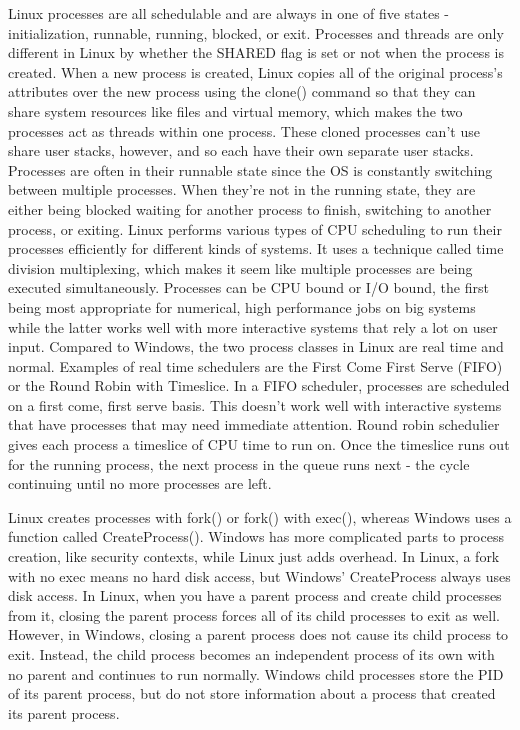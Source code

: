 \documentclass[10pt,draftclsnofoot,onecolumn,letterpaper]{IEEEtran}
\begin{document}
Linux processes are all schedulable and are always in one of five states - initialization, runnable, running, blocked, or exit. Processes and threads are only different in Linux by whether the SHARED flag is set or not when the process is created\cite{1}. When a new process is created, Linux copies all of the original process's attributes over the new process using the clone() command so that they can share system resources like files and virtual memory, which makes the two processes act as threads within one process. These cloned processes can't use share user stacks, however, and so each have their own separate user stacks\cite{2}.
Processes are often in their runnable state since the OS is constantly switching between multiple processes. When they're not in the running state, they are either being blocked waiting for another process to finish, switching to another process, or exiting\cite{1}.
Linux performs various types of CPU scheduling to run their processes efficiently for different kinds of systems. It uses a technique called time division multiplexing, which makes it seem like multiple processes are being executed simultaneously. Processes can be CPU bound or I/O bound, the first being most appropriate for numerical, high performance jobs on big systems while the latter works well with more interactive systems that rely a lot on user input\cite{1}. Compared to Windows, the two process classes in Linux are real time and normal. Examples of real time schedulers are the First Come First Serve (FIFO) or the Round Robin with Timeslice. In a FIFO scheduler, processes are scheduled on a first come, first serve basis. This doesn't work well with interactive systems that have processes that may need immediate attention. Round robin schedulier gives each process a timeslice of CPU time to run on. Once the timeslice runs out for the running process, the next process in the queue runs next - the cycle continuing until no more processes are left\cite{1}.

Linux creates processes with fork() or fork() with exec(), whereas Windows uses a function called CreateProcess(). Windows has more complicated parts to process creation, like security contexts, while Linux just adds overhead. In Linux, a fork with no exec means no hard disk access, but Windows' CreateProcess always uses disk access\cite{4}.
In Linux, when you have a parent process and create child processes from it, closing the parent process forces all of its child processes to exit as well. However, in Windows, closing a parent process does not cause its child process to exit. Instead, the child process becomes an independent process of its own with no parent and continues to run normally. Windows child processes store the PID of its parent process, but do not store information about a process that created its parent process.
\end{document}

